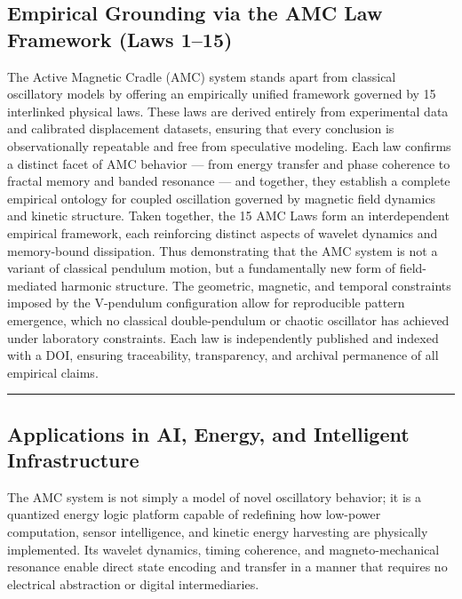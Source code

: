 \documentclass[10pt,aps,pre,onecolumn,superscriptaddress,notitlepage]{revtex4-2}
\begin{document}
\subsection{Empirical Grounding via the AMC Law Framework (Laws 1–15)}
\label{sec:EmpiricalGrounding}
The Active Magnetic Cradle (AMC) system stands apart from classical oscillatory models by offering an empirically unified framework governed by 15 interlinked physical laws. These laws are derived entirely from experimental data and calibrated displacement datasets, ensuring that every conclusion is observationally repeatable and free from speculative modeling.
Each law confirms a distinct facet of AMC behavior — from energy transfer and phase coherence to fractal memory and banded resonance — and together, they establish a complete empirical ontology for coupled oscillation governed by magnetic field dynamics and kinetic structure. 
Taken together, the 15 AMC Laws form an interdependent empirical framework, each reinforcing distinct aspects of wavelet dynamics and memory-bound dissipation. Thus demonstrating that the AMC system is not a variant of classical pendulum motion, but a fundamentally new form of field-mediated harmonic structure. The geometric, magnetic, and temporal constraints imposed by the V-pendulum configuration allow for reproducible pattern emergence, which no classical double-pendulum or chaotic oscillator has achieved under laboratory constraints. Each law is independently published and indexed with a DOI, ensuring traceability, transparency, and archival permanence of all empirical claims.
\vspace{1em}
\hrule
\vspace{0.2em}

\subsection{Applications in AI, Energy, and Intelligent Infrastructure}
\label{sec:ApplicationsinAI}
The AMC system is not simply a model of novel oscillatory behavior; it is a quantized energy logic platform capable of redefining how low-power computation, sensor intelligence, and kinetic energy harvesting are physically implemented. Its wavelet dynamics, timing coherence, and magneto-mechanical resonance enable direct state encoding and transfer in a manner that requires no electrical abstraction or digital intermediaries.
\end{document}
